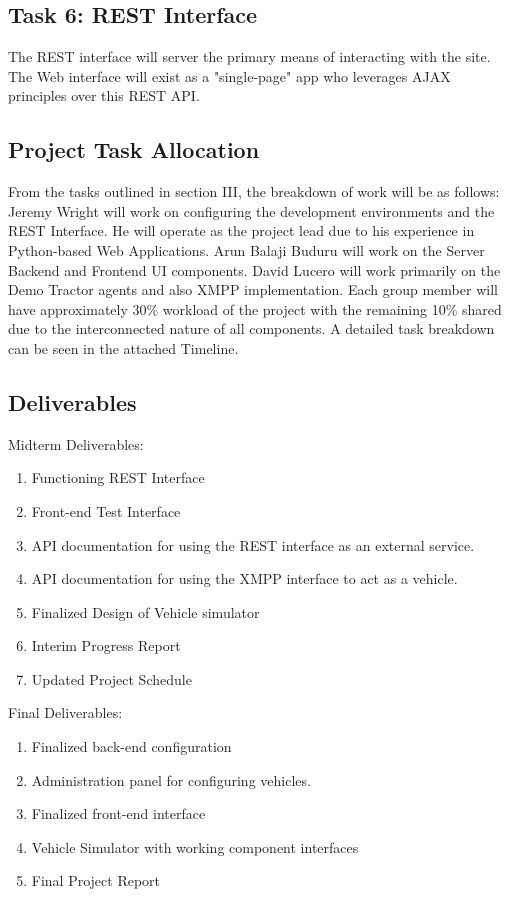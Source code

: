 \documentclass[conference,12pt]{IEEEtran}
\begin{document}
\subsection{Task 6: REST Interface}
The REST interface will server the primary means of interacting with the site.
The Web interface will exist as a "single-page" app who leverages AJAX
principles over this REST API. 
\subsection{Project Task Allocation}

From the tasks outlined in section III, the breakdown of work will be as follows:
Jeremy Wright will work on configuring the development environments and the REST Interface.
He will operate as the project lead due to his experience in Python-based Web Applications.
Arun Balaji Buduru will work on the Server Backend and Frontend UI components.
David Lucero will work primarily on the Demo Tractor agents and also XMPP implementation.
Each group member will have approximately 30\% workload of the project with the remaining
10\% shared due to the interconnected nature of all components. A detailed task breakdown
can be seen in the attached Timeline.

\subsection{Deliverables}

Midterm Deliverables:
\begin{enumerate}
\item Functioning REST Interface
\item Front-end Test Interface
\item API documentation for using the REST interface as an external service.
\item API documentation for using the XMPP interface to act as a vehicle.
\item Finalized Design of Vehicle simulator
\item Interim Progress Report
\item Updated Project Schedule
\end{enumerate}

Final Deliverables:
\begin{enumerate}
\item Finalized back-end configuration
\item Administration panel for configuring vehicles.
\item Finalized front-end interface
\item Vehicle Simulator with working component interfaces
\item Final Project Report
\end{enumerate}
\end{document}
